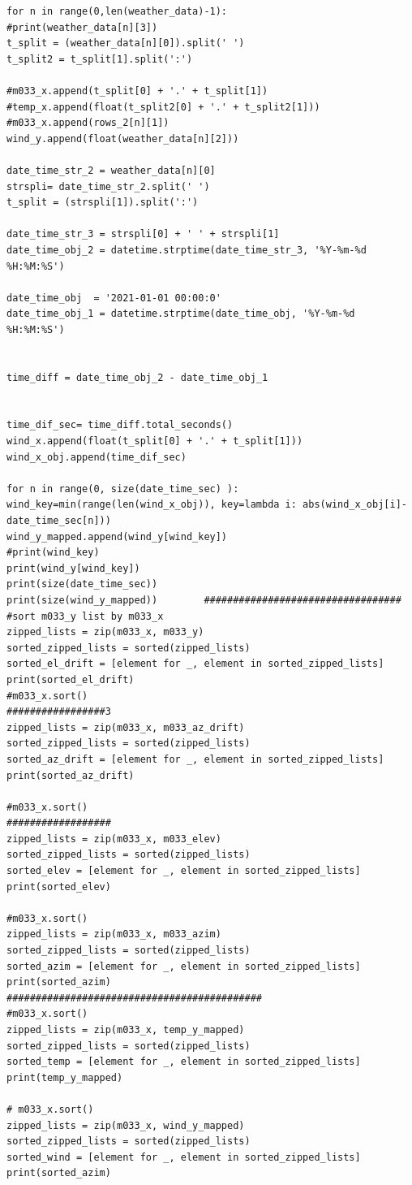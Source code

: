 \documentclass{article}
\begin{document}
{\begin{appendices}
\begin{lstlisting}
for n in range(0,len(weather_data)-1):
#print(weather_data[n][3])
t_split = (weather_data[n][0]).split(' ')
t_split2 = t_split[1].split(':')

#m033_x.append(t_split[0] + '.' + t_split[1])
#temp_x.append(float(t_split2[0] + '.' + t_split2[1]))
#m033_x.append(rows_2[n][1])
wind_y.append(float(weather_data[n][2]))

date_time_str_2 = weather_data[n][0]
strspli= date_time_str_2.split(' ')
t_split = (strspli[1]).split(':')

date_time_str_3 = strspli[0] + ' ' + strspli[1] 
date_time_obj_2 = datetime.strptime(date_time_str_3, '%Y-%m-%d %H:%M:%S')

date_time_obj  = '2021-01-01 00:00:0'  
date_time_obj_1 = datetime.strptime(date_time_obj, '%Y-%m-%d %H:%M:%S')


time_diff = date_time_obj_2 - date_time_obj_1       


time_dif_sec= time_diff.total_seconds()
wind_x.append(float(t_split[0] + '.' + t_split[1]))
wind_x_obj.append(time_dif_sec)

for n in range(0, size(date_time_sec) ):
wind_key=min(range(len(wind_x_obj)), key=lambda i: abs(wind_x_obj[i]-date_time_sec[n]))
wind_y_mapped.append(wind_y[wind_key])
#print(wind_key)
print(wind_y[wind_key])
print(size(date_time_sec))                  
print(size(wind_y_mapped))        ##################################
#sort m033_y list by m033_x
zipped_lists = zip(m033_x, m033_y)
sorted_zipped_lists = sorted(zipped_lists)
sorted_el_drift = [element for _, element in sorted_zipped_lists]
print(sorted_el_drift)
#m033_x.sort()
#################3
zipped_lists = zip(m033_x, m033_az_drift)
sorted_zipped_lists = sorted(zipped_lists)
sorted_az_drift = [element for _, element in sorted_zipped_lists]
print(sorted_az_drift)

#m033_x.sort()
##################
zipped_lists = zip(m033_x, m033_elev)
sorted_zipped_lists = sorted(zipped_lists)
sorted_elev = [element for _, element in sorted_zipped_lists]
print(sorted_elev)

#m033_x.sort()
zipped_lists = zip(m033_x, m033_azim)
sorted_zipped_lists = sorted(zipped_lists)
sorted_azim = [element for _, element in sorted_zipped_lists]
print(sorted_azim)
############################################
#m033_x.sort()
zipped_lists = zip(m033_x, temp_y_mapped)
sorted_zipped_lists = sorted(zipped_lists)
sorted_temp = [element for _, element in sorted_zipped_lists]
print(temp_y_mapped)

# m033_x.sort()
zipped_lists = zip(m033_x, wind_y_mapped)
sorted_zipped_lists = sorted(zipped_lists)
sorted_wind = [element for _, element in sorted_zipped_lists]
print(sorted_azim)


\end{lstlisting}
\end{appendices}}
\end{document}
